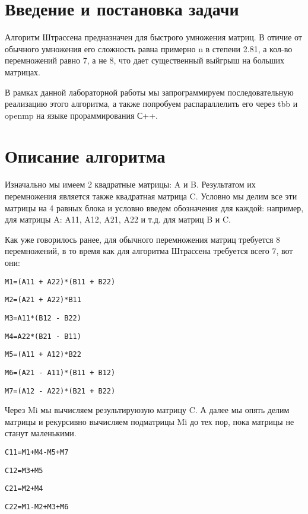 \documentclass{report}
\begin{document}
\setcounter{page}{2}

\tableofcontents
\newpage


\section{Введение и постановка задачи}
\par Алгоритм Штрассена предназначен для быстрого умножения матриц. В отичие от обычного умножения его сложность равна примерно n в степени 2.81, а кол-во перемножений равно 7, а не 8, что дает существенный выйгрыш на больших матрицах.
\par В рамках данной лабораторной работы мы запрограммируем последовательную реализацию этого алгоритма, а также попробуем распараллелить его через tbb и openmp на языке прораммирования С++.

\newpage
\section{Описание алгоритма}
\par Изначально мы имеем 2 квадратные матрицы: A и B. Результатом их перемножения является также квадратная матрица C. Условно мы делим все эти матрицы на 4 равных блока и условно введем обозначения для каждой: например, для матрицы A: A11, A12, A21, A22 и т.д. для матриц B и C.
\par Как уже говорилось ранее, для обычного перемножения матриц требуется 8 перемножений, в то время как для алгоритма Штрассена требуется всего 7, вот они:
\par 
\verb|M1=(A11 + A22)*(B11 + B22)|

\verb|M2=(A21 + A22)*B11|

\verb|M3=A11*(B12 - B22)|

\verb|M4=A22*(B21 - B11)|

\verb|M5=(A11 + A12)*B22|

\verb|M6=(A21 - A11)*(B11 + B12)|

\verb|M7=(A12 - A22)*(B21 + B22)|

\par Через Mi мы вычисляем результируюзую матрицу C. А далее мы опять делим матрицы и рекурсивно вычисляем подматрицы Mi до тех пор, пока матрицы не станут маленькими.

\verb|C11=M1+M4-M5+M7|

\verb|C12=M3+M5|

\verb|C21=M2+M4|

\verb|C22=M1-M2+M3+M6|
\end{document}
